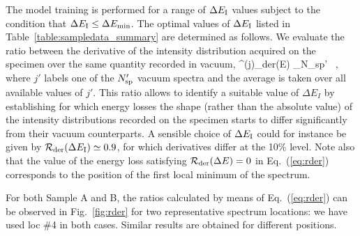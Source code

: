 The model training is performed for a range of $\Delta E_{\rm I}$ values
subject to the condition that $\Delta E_{\rm I} \le \Delta E_{\rm min}$.
%
The optimal values of $\Delta E_{\rm I}$ listed in Table~\ref{table:sampledata_summary} are
determined as follows.
%
We evaluate the ratio
between the derivative of the intensity distribution acquired on the specimen over the
same quantity recorded in vacuum,
\be
\label{eq:rder}
^{(j)}_{\rm der}(\Delta E) \equiv
\la
{} \ra_{N_{\rm sp}' } \, ,
\ee
where $j'$ labels one of the $N_{\rm sp}'$ vacuum spectra and the average is taken
over all available values of $j'$.
%
This ratio allows to identify a suitable value of $\Delta E_{I}$ by establishing
for which energy losses the shape (rather than the absolute value) of the intensity distributions 
recorded on the specimen starts to differ significantly from their vacuum counterparts.
%
A sensible choice of $\Delta E_{\rm I}$ could for instance be given by
$\mathcal{R}_{\rm der}(\Delta E_{\rm I}) \simeq 0.9$, for which derivatives differ
at the 10\% level.
%
Note also that the value of the energy loss satisfying
$\mathcal{R}_{\rm der}(\Delta E)=0$ in Eq.~(\ref{eq:rder}) corresponds to the position of the first
local minimum of the spectrum.

For both Sample A and B, the ratios calculated by means of Eq.~(\ref{eq:rder}) 
can be observed in Fig.~\ref{fig:rder} for two representative spectrum locations: 
we have used loc \#4 in both cases. Similar results are obtained for different
positions.

